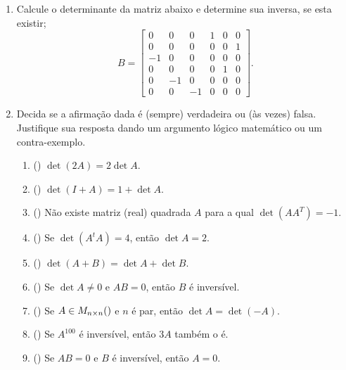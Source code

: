 \documentclass{report}
\begin{document}
\begin{Exercise}
\begin{enumerate}
\item \label{1lista40} Calcule o determinante da matriz abaixo e
determine sua inversa, se esta existir; $$B=\left[
\begin{array}{rrrrrr}
0 & 0 & 0 & 1 & 0 & 0 \\
0 & 0 & 0 & 0 & 0 & 1\\
-1 & 0 & 0 & 0 & 0 & 0\\
0 & 0 & 0 & 0 & 1 & 0 \\
0 & -1 & 0 & 0 & 0 & 0 \\
0 & 0 & -1 & 0 & 0 & 0
\end{array}
\right].$$


\item \label{1lista41}  Decida se a afirmação dada é (sempre)
verdadeira ou (às vezes) falsa. Justifique sua resposta dando um
argumento lógico matemático ou um contra-exemplo.

\begin{enumerate}
\item  (\quad ) $\det ( 2A) =2\det A $.

\item  (\quad ) $\det ( I+A) =1+\det A $.

\item  (\quad ) Não existe matriz (real) quadrada $A$ para a qual
$\det \left( AA^{T}\right) =-1$.

\item  (\quad ) Se $\det (A^tA) =4$, então $\det A =2 $.

\item  (\quad ) $\det (A + B) =\det A + \det B $.

\item  (\quad ) Se $\det A \ne 0$ e $AB = 0$, então $B$ é
inversível.

\item  (\quad ) Se $A \in M_{n \times n} ( \real)$ e $n$ é par,
então $\det A = \det (-A)$.

\item  (\quad ) Se $A^{100}$ é inversível, então $3A$ também o é.

\item  (\quad ) Se $AB = 0$ e $B$ é inversível, então $A=0$.
\end{enumerate}



\end{enumerate}
\end{Exercise}
\end{document}
